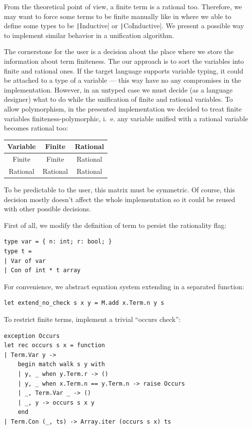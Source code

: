 From the theoretical point of view, a finite term is a rational too. Therefore, we may want to force some terms to be finite manually like in \Rocq where we able to define some types to be \texttt|Inductive| or \texttt|CoInductive|. We present a possible way to implement similar behavior in a unification algorithm.

The cornerstone for the user is a decision about the place where we store the information about term finiteness. The our approach is to sort the variables into finite and rational ones. If the target language supports variable typing, it could be attached to a type of a variable --- this way have no any compromises in the implementation. However, in an untyped case we must decide (as a language designer) what to do while the unification of finite and rational variables. To allow polymorphism, in the presented implementation we decided to treat finite variables finiteness-polymorphic, i.~e. any variable unified with a rational variable becomes rational too:
\begin{table}[H]
    \centering
    \begin{tabular}{c|cc}
        Variable & Finite & Rational \\
        \hline
        Finite & Finite & Rational \\
        Rational & Rational & Rational \\
    \end{tabular}
\end{table}

To be predictable to the user, this matrix must be symmetric. Of course, this decision mostly doesn't affect the whole implementation so it could be reused with other possible decisions.

First of all, we modify the definition of term to persist the rationality flag:
\begin{verbatim}
type var = { n: int; r: bool; }
type t =
| Var of var
| Con of int * t array
\end{verbatim}

For convenience, we abstract equation system extending in a separated function:
\begin{verbatim}
let extend_no_check s x y = M.add x.Term.n y s
\end{verbatim}

To restrict finite terms, implement a trivial ``occurs check'':
\begin{verbatim}
exception Occurs
let rec occurs s x = function
| Term.Var y ->
    begin match walk s y with
    | y, _ when y.Term.r -> ()
    | y, _ when x.Term.n == y.Term.n -> raise Occurs
    | _, Term.Var _ -> ()
    | _, y -> occurs s x y
    end
| Term.Con (_, ts) -> Array.iter (occurs s x) ts
\end{verbatim}

